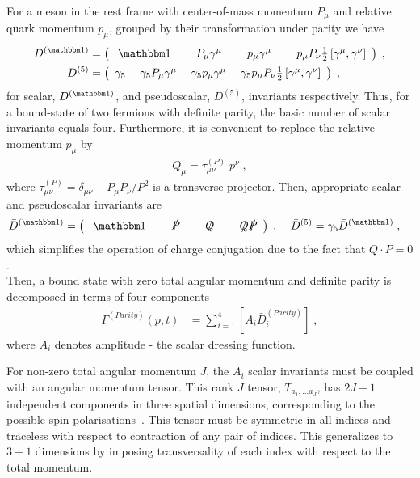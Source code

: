 For a meson in the rest frame with center-of-mass momentum $P_\mu$ and
relative quark momentum $p_\mu$, grouped by their transformation under parity we have
%
\begin{align}\label{eqn:scalarinvariants1}
D^{(\ONE)}&=
\left(\begin{array}{ccccc}
\;\ONE\; &
\phantom{\gamma_5}P_\mu \gamma^\mu\;&
\phantom{\gamma_5}p_\mu \gamma^\mu\;&
\phantom{\gamma_5}p_\mu P_\nu \frac{1}{2}\left[\gamma^\mu,\gamma^\nu\right]
\end{array}\right)\;, \\
%
D^{(5)}&=
\left(\begin{array}{ccccc}
\gamma_5\;&
\gamma_5 P_\mu \gamma^\mu\;&
\gamma_5 p_\mu \gamma^\mu\;&
\gamma_5 p_\mu P_\nu \frac{1}{2}\left[\gamma^\mu,\gamma^\nu\right]
\end{array}\right)\;,
\end{align}
%
for scalar, $D^{(\ONE)}$, and pseudoscalar, $D^{(5)}$, invariants respectively. Thus, for a 
bound-state of two fermions with definite parity, the basic number of scalar invariants equals
four. Furthermore, it is convenient to replace the relative momentum $p_\mu$ by
%
\begin{align}\label{eqn:transverseQ}
Q_\mu = \tau^{(P)}_{\mu\nu}\;p^\nu\;,
\end{align}
%
where $ \tau^{(P)}_{\mu\nu}=\delta_{\mu\nu}-P_\mu P_\nu/P^2$ is a transverse projector.
%
Then, appropriate scalar and pseudoscalar invariants are
%
\begin{align}\label{eqn:scalarinvariants2}
\bar{D}^{(\ONE)}&=
\left(\begin{array}{ccccc}
\;\ONE\; &
\phantom{\gamma_5}\slashed{P}\;&
\phantom{\gamma_5}\slashed{Q}\;&
\phantom{\gamma_5}\slashed{Q}\slashed{P}
\end{array}\right)\;,\;\;\;\;
%
\bar{D}^{(5)}=\gamma_5\bar{D}^{(\ONE)}\;,
\end{align}
%
which simplifies the operation of charge conjugation due to the fact that $Q\cdot P=0$.\\

Then, a bound state with zero total angular momentum and definite parity is decomposed in terms of 
four components
%
\begin{align}
\Gamma^{(Parity)}(p,t) &= \sum_{i=1}^{4} \left[A_i  \bar{D}_{i}^{(Parity)}\right]\;,
\end{align}
where $A_i$ denotes \BS amplitude - the scalar dressing function. 

For non-zero total angular momentum $J$, the $A_i$ scalar invariants
must be coupled with an angular momentum tensor. This rank $J$ tensor, $T_{a_1,\ldots a_J}$, has 
$2J+1$ independent components in three spatial dimensions, corresponding to the possible spin 
polarisations~\cite{Zemach:1968zz}. This tensor must be 
symmetric in all indices and traceless with respect to contraction of any pair of indices.
This generalizes to $3+1$ dimensions by imposing transversality of each 
index with respect to the total momentum.

